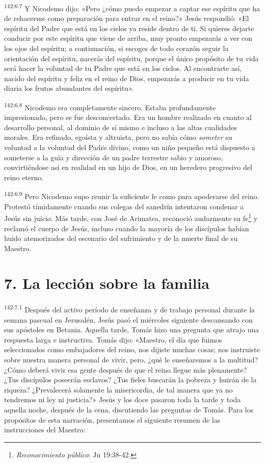 \par
\textsuperscript{142:6.7} Y Nicodemo dijo: «Pero ¿cómo puedo empezar a captar ese espíritu que ha de rehacerme como preparación para entrar en el reino?» Jesús respondió: «El espíritu del Padre que está en los cielos ya reside dentro de ti. Si quieres dejarte conducir por este espíritu que viene de arriba, muy pronto empezarás a ver con los ojos del espíritu; a continuación, si escoges de todo corazón seguir la orientación del espíritu, nacerás del espíritu, porque el único propósito de tu vida será hacer la voluntad de tu Padre que está en los cielos. Al encontrarte así, nacido del espíritu y feliz en el reino de Dios, empezarás a producir en tu vida diaria los frutos abundantes del espíritu».

\par
\textsuperscript{142:6.8} Nicodemo era completamente sincero. Estaba profundamente impresionado, pero se fue desconcertado. Era un hombre realizado en cuanto al desarrollo personal, al dominio de sí mismo e incluso a las altas cualidades morales. Era refinado, egoísta y altruista, pero no sabía cómo \textit{someter} su voluntad a la voluntad del Padre divino, como un niño pequeño está dispuesto a someterse a la guía y dirección de un padre terrestre sabio y amoroso, convirtiéndose así en realidad en un hijo de Dios, en un heredero progresivo del reino eterno.

\par
\textsuperscript{142:6.9} Pero Nicodemo supo reunir la suficiente fe como para apoderarse del reino. Protestó tímidamente cuando sus colegas del sanedrín intentaron condenar a Jesús sin juicio. Más tarde, con José de Arimatea, reconoció audazmente su fe\footnote{\textit{Reconocimiento público}: Jn 19:38-42.} y reclamó el cuerpo de Jesús, incluso cuando la mayoría de los discípulos habían huido atemorizados del escenario del sufrimiento y de la muerte final de su Maestro.

\section*{7. La lección sobre la familia}
\par
\textsuperscript{142:7.1} Después del activo período de enseñanza y de trabajo personal durante la semana pascual en Jerusalén, Jesús pasó el miércoles siguiente descansando con sus apóstoles en Betania. Aquella tarde, Tomás hizo una pregunta que atrajo una respuesta larga e instructiva. Tomás dijo: «Maestro, el día que fuimos seleccionados como embajadores del reino, nos dijiste muchas cosas; nos instruiste sobre nuestra manera personal de vivir, pero, ¿qué le enseñaremos a la multitud? ¿Cómo deberá vivir esa gente después de que el reino llegue más plenamente? ¿Tus discípulos poseerán esclavos? ¿Tus fieles buscarán la pobreza y huirán de la riqueza? ¿Prevalecerá solamente la misericordia, de tal manera que ya no tendremos ni ley ni justicia?» Jesús y los doce pasaron toda la tarde y toda aquella noche, después de la cena, discutiendo las preguntas de Tomás. Para los propósitos de esta narración, presentamos el siguiente resumen de las instrucciones del Maestro:

